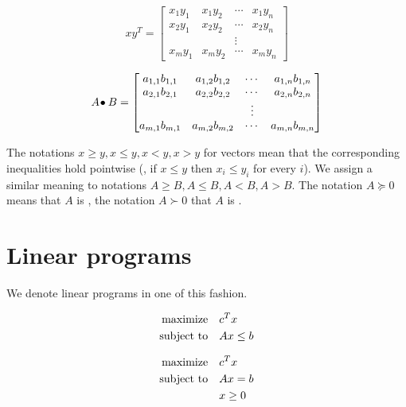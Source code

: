 \documentclass[a4paper,justified]{tufte-handout}
\begin{document}
\begin{figure*}
\begin{minipage}[b]{0.45\textwidth}
\begin{equation*}
  xy^{T}=\begin{bmatrix}
  x_{1}y_{1} & x_{1}y_{2} & \cdots & x_{1}y_{n} \\
  x_{2}y_{1} & x_{2}y_{2} & \cdots & x_{2}y_{n} \\
  & & \vdots & \\
  x_{m}y_{1} & x_{m}y_{2} & \cdots & x_{m}y_{n}
\end{bmatrix}
\end{equation*}
\end{minipage}
\begin{minipage}[b]{0.45\textwidth}
  \begin{equation*}
    {A}\!\bullet{B}=\begin{bmatrix}
      a_{1,1}b_{1,1} & a_{1,2}b_{1,2} & \cdots & a_{1,n}b_{1,n} \\
      a_{2,1}b_{2,1} & a_{2,2}b_{2,2} & \cdots & a_{2,n}b_{2,n} \\
      & & \vdots & \\
      a_{m,1}b_{m,1} & a_{m,2}b_{m,2} & \cdots & a_{m,n}b_{m,n}
    \end{bmatrix}
  \end{equation*} 
\end{minipage}
\end{figure*}

The notations $ x \geq y, x \leq y, x < y, x > y$ for vectors mean
that the corresponding inequalities hold pointwise (\ie, if $ x \leq y
$ then $ x_{i} \leq y_{i} $ for every $ i $). We assign a similar
meaning to notations $ A \geq B, A \leq B, A < B, A > B$.
%
The notation $ A \succeq 0 $ means that $ A $ is
, the notation $ A \succ 0 $ that
$ A $ is .

\section{Linear programs}

We denote linear programs in one of this fashion.

\begin{figure}
\begin{minipage}[t]{0.5\textwidth}
\begin{alignat*}{2}
  \text{maximize}\hspace{1em}& c^{T}x\\
  \text{subject to}\hspace{1em}& Ax \leq b
\end{alignat*}
\end{minipage}
\begin{minipage}[t]{0.5\textwidth}
\begin{alignat*}{2}
  \text{maximize}\hspace{1em}& c^{T}x \\
  \text{subject to}\hspace{1em}& Ax = b\\
  & x \geq 0
\end{alignat*}
\end{minipage}
\end{figure}
\end{document}
